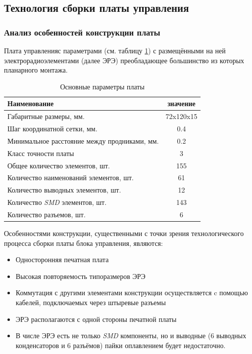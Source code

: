 \subsection{Технология сборки платы управления}
\subsubsection{Анализ особенностей конструкции платы}
Плата управленияс параметрами (см. таблицу \ref{comon_board_param})
с размещёнными на ней электрорадиоэлементами (далее ЭРЭ) преобладающее
большинство из которых планарного монтажа.

\begin{table}[ht!]
    \centering
    \begin{tabular}{|l|c|}
        \hline
        Наименование & значение \\
        \hline
        Габаритные размеры, мм. & 72x120x15 \\
        Шаг координатной сетки, мм. & 0.4 \\
        Минимальное расстояние между продниками, мм. & 0.2 \\
        Класс точности платы & 3 \\
        Общее количество элементов, шт. & 155 \\
        Количество наименований элементов, шт. & 61 \\
        Количество выводных элементов, шт. & 12 \\
        Количество \textit{SMD} элементов, шт. & 143 \\
        Количество разъемов, шт. & 6 \\
        \hline
    \end{tabular}
    \caption{Основные параметры платы}
    \label{comon_board_param}
\end{table}

Особенностями конструкции, существенными с точки зрения технологического
процесса сборки платы блока управления, являются:
\begin{itemize}
    \item Односторонняя печатная плата
    \item Высокая повторяемость типоразмеров ЭРЭ
    \item Коммутация с другими элементами конструкции осуществляется c помощью
        кабелей, подключаемых через штыревые разъемы
    \item ЭРЭ располагаются с одной стороны печатной платы
    \item В числе ЭРЭ есть не только \textit{SMD} компоненты, но и выводные
        (6 выводных конденсаторов и 6 разъёмов) пайки оплавлением будет
        недостаточно.
\end{itemize}

